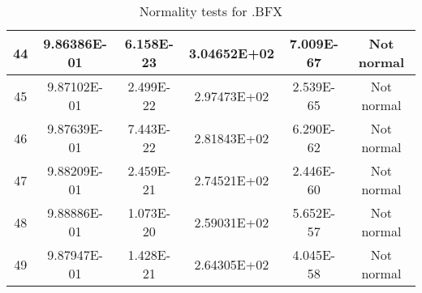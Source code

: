 \begin{table}[h]
\begin{tabular}{|c|c|c|c|c|c|}
		44 & 9.86386E-01 & 6.158E-23 & 3.04652E+02 & 7.009E-67 & Not normal\\\hline
		45 & 9.87102E-01 & 2.499E-22 & 2.97473E+02 & 2.539E-65 & Not normal\\\hline
		46 & 9.87639E-01 & 7.443E-22 & 2.81843E+02 & 6.290E-62 & Not normal\\\hline
		47 & 9.88209E-01 & 2.459E-21 & 2.74521E+02 & 2.446E-60 & Not normal\\\hline
		48 & 9.88886E-01 & 1.073E-20 & 2.59031E+02 & 5.652E-57 & Not normal\\\hline
		49 & 9.87947E-01 & 1.428E-21 & 2.64305E+02 & 4.045E-58 & Not normal\\\hline
	\end{tabular}
	\caption{Normality tests for .BFX}
\end{table}
